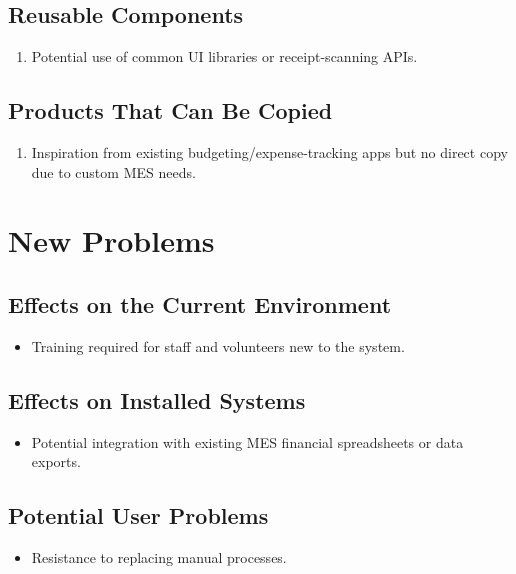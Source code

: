 \documentclass[12pt]{article}
\begin{document}
\subsection{Reusable Components}
\begin{enumerate}
  \item Potential use of common UI libraries or receipt-scanning APIs.
\end{enumerate}

\subsection{Products That Can Be Copied}
\begin{enumerate}
  \item Inspiration from existing budgeting/expense-tracking apps but no direct copy due to custom MES needs.
\end{enumerate}

\section{New Problems}
\subsection{Effects on the Current Environment}
\begin{itemize}
    \item Training required for staff and volunteers new to the system.
\end{itemize}

\subsection{Effects on Installed Systems}
\begin{itemize}
    \item Potential integration with existing MES financial spreadsheets or data exports.
\end{itemize}

\subsection{Potential User Problems}
\begin{itemize}
    \item Resistance to replacing manual processes.
\end{itemize}
\end{document}
